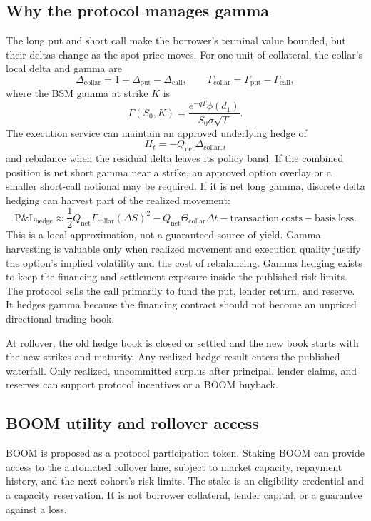\documentclass[11pt,oneside]{article}
\newcommand{\BOOM}{\textsf{BOOM}}
\newcommand{\phiN}{\phi}
\begin{document}
\subsection{Why the protocol manages gamma}

The long put and short call make the borrower's terminal value bounded, but
their deltas change as the spot price moves. For one unit of collateral, the
collar's local delta and gamma are
\[
\Delta_{\mathrm{collar}}=1+\Delta_{\mathrm{put}}-\Delta_{\mathrm{call}},
\qquad
\Gamma_{\mathrm{collar}}=\Gamma_{\mathrm{put}}-\Gamma_{\mathrm{call}},
\]
where the BSM gamma at strike $K$ is
\[
\Gamma(S_0,K)=\frac{e^{-qT}\phiN(d_1)}{S_0\sigma\sqrt{T}}.
\]
The execution service can maintain an approved underlying hedge of
\[
H_t=-Q_{\mathrm{net}}\Delta_{\mathrm{collar},t}
\]
and rebalance when the residual delta leaves its policy band. If the combined
position is net short gamma near a strike, an approved option overlay or a
smaller short-call notional may be required. If it is net long gamma, discrete
delta hedging can harvest part of the realized movement:
\[
\mathrm{P\&L}_{\mathrm{hedge}}
\approx \frac12 Q_{\mathrm{net}}\Gamma_{\mathrm{collar}}(\Delta S)^2
-Q_{\mathrm{net}}\Theta_{\mathrm{collar}}\Delta t
-\mathrm{transaction\ costs}
-\mathrm{basis\ loss}.
\]
This is a local approximation, not a guaranteed source of yield. Gamma
harvesting is valuable only when realized movement and execution quality
justify the option's implied volatility and the cost of rebalancing. Gamma
hedging exists to keep the financing and settlement exposure inside the
published risk limits. The protocol sells the call primarily to fund the put,
lender return, and reserve. It hedges gamma because the financing contract
should not become an unpriced directional trading book.

At rollover, the old hedge book is closed or settled and the new book starts
with the new strikes and maturity. Any realized hedge result enters the
published waterfall. Only realized, uncommitted surplus after principal,
lender claims, and reserves can support protocol incentives or a \BOOM{}
buyback.

\subsection{\BOOM{} utility and rollover access}

\BOOM{} is proposed as a protocol participation token. Staking \BOOM{} can
provide access to the automated rollover lane, subject to market capacity,
repayment history, and the next cohort's risk limits. The stake is an
eligibility credential and a capacity reservation. It is not borrower
collateral, lender capital, or a guarantee against a loss.
\end{document}
